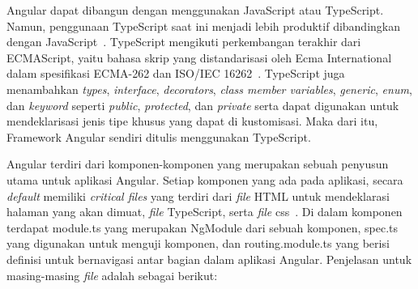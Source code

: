 Angular dapat dibangun dengan menggunakan JavaScript atau TypeScript. Namun, penggunaan TypeScript saat ini menjadi lebih produktif dibandingkan dengan JavaScript~\cite{fain:18:angular}. TypeScript mengikuti perkembangan terakhir dari ECMAScript, yaitu bahasa skrip yang distandarisasi oleh Ecma International dalam spesifikasi ECMA-262 dan ISO/IEC 16262~\cite{rarayan:15:learning}. TypeScript juga menambahkan \textit{types}, \textit{interface}, \textit{decorators}, \textit{class member variables}, \textit{generic}, \textit{enum}, dan \textit{keyword} seperti \textit{public}, \textit{protected}, dan \textit{private} serta dapat digunakan untuk mendeklarisasi jenis tipe khusus yang dapat di kustomisasi. Maka dari itu, Framework Angular sendiri ditulis menggunakan TypeScript.

Angular terdiri dari komponen-komponen yang merupakan sebuah penyusun utama untuk aplikasi Angular. Setiap komponen yang ada pada aplikasi, secara \textit{default} memiliki \textit{critical files} yang terdiri dari \textit{file} HTML untuk mendeklarasi halaman yang akan dimuat, \textit{file} TypeScript, serta \textit{file} css~\cite{gion:18:mastering}. Di dalam komponen terdapat module.ts yang merupakan NgModule dari sebuah komponen, spec.ts yang digunakan untuk menguji komponen, dan routing.module.ts yang berisi definisi untuk bernavigasi antar bagian dalam aplikasi Angular. Penjelasan untuk masing-masing \textit{file} adalah sebagai berikut:

